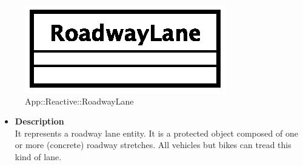 \begin{figure}[h]
\centering
\includegraphics[scale=0.6,keepaspectratio]{images/solution/roadway_lane.eps}
\caption{App::Reactive::RoadwayLane}
\label{fig:sd-app-roadway_lane}
\end{figure}
\FloatBarrier
\begin{itemize}
  \item \textbf{Description} \\
    It represents a roadway lane entity. It is a protected object composed of
    one or more (concrete) roadway stretches. All vehicles but bikes can tread
    this kind of lane.
\end{itemize}

